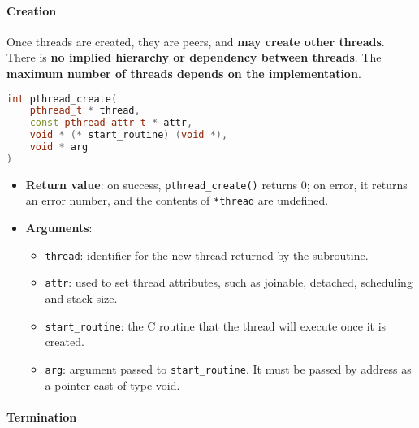 \longline

\paragraph{Creation}\label{paragraph: Creation}

Once threads are created, they are peers, and \textbf{may create other threads}. There is \textbf{no implied hierarchy or dependency between threads}. The \textbf{maximum number of threads depends on the implementation}.
\begin{definitionbox}
    \begin{lstlisting}[language=c++]
int pthread_create(
    pthread_t * thread,
    const pthread_attr_t * attr,
    void * (* start_routine) (void *),
    void * arg
)\end{lstlisting}
\end{definitionbox}

\noindent
\begin{itemize}
    \item \textbf{Return value}: on success, \texttt{pthread\_create()} returns 0; on error, it returns an error number, and the contents of \texttt{*thread} are undefined.
    \item \textbf{Arguments}:
    \begin{itemize}
        \item \texttt{thread}: identifier for the new thread returned by the subroutine.
        \item \texttt{attr}: used to set thread attributes, such as joinable, detached, scheduling and stack size.
        \item \texttt{start\_routine}: the C routine that the thread will execute once it is created.
        \item \texttt{arg}: argument passed to \texttt{start\_routine}. It must be passed by address as a pointer cast of type void.
    \end{itemize}
\end{itemize}


\paragraph{Termination}\label{paragraph: Termination}

